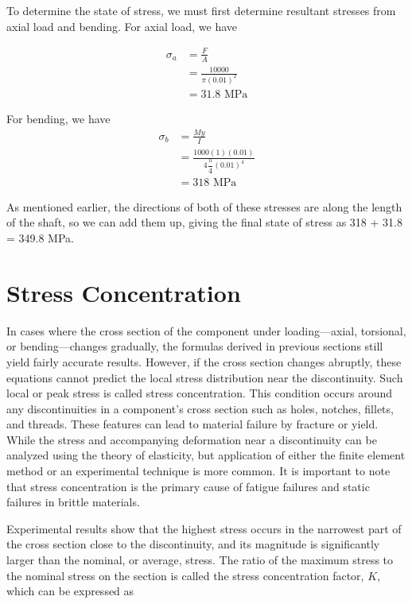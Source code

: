\documentclass[a4paper,openany,12pt]{book}
\begin{document}
\hspace{2cm}

To determine the state of stress, we must first determine resultant
stresses from axial load and bending. For axial load, we have

$$\begin{aligned}
    \sigma_a &= \frac{F}{A} \\
             &= \frac{10000}{\pi (0.01)^2} \\
             &= 31.8 \text{ MPa}
  \end{aligned}$$

For bending, we have $$\begin{aligned}
    \sigma_b &= \frac{My}{I} \\
             &= \frac{1000(1)(0.01)}{4 \dfrac{\pi}{4}(0.01)^4} \\
             &= 318 \text{ MPa}
  \end{aligned}$$

As mentioned earlier, the directions of both of these stresses are along
the length of the shaft, so we can add them up, giving the final state
of stress as 318 + 31.8 = 349.8 MPa.

\section{Stress Concentration}
\label{sec:org4be237a}
In cases where the cross section of the component under loading---axial,
torsional, or bending---changes gradually, the formulas derived in
previous sections still yield fairly accurate results. However, if the
cross section changes abruptly, these equations cannot predict the local
stress distribution near the discontinuity. Such local or peak stress is
called stress concentration. This condition occurs around any
discontinuities in a component's cross section such as holes, notches,
fillets, and threads. These features can lead to material failure by
fracture or yield. While the stress and accompanying deformation near a
discontinuity can be analyzed using the theory of elasticity, but
application of either the finite element method or an experimental
technique is more common. It is important to note that stress
concentration is the primary cause of fatigue failures and static
failures in brittle materials.

Experimental results show that the highest stress occurs in the
narrowest part of the cross section close to the discontinuity, and its
magnitude is significantly larger than the nominal, or average, stress.
The ratio of the maximum stress to the nominal stress on the section is
called the stress concentration factor, \(K\), which can be expressed as
\end{document}
